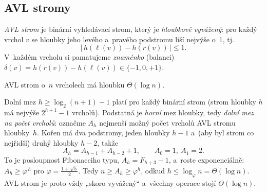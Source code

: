\documentclass[11pt,a4paper]{article}
\begin{document}
\begin{center}
\end{center}

\subsection{AVL stromy}

\begin{definice}
\emph{AVL strom} je binární vyhledávací strom, který je \emph{hloubkově vyvážený}: pro každý vrchol $v$ se hloubky jeho levého a~pravého podstromu liší nejvýše o~1, tj.
\[
\bigl|\,h(\ell(v))-h(r(v))\,\bigr|\le 1 .
\]
V~každém vrcholu si pamatujeme \emph{znaménko} (balanci) $\delta(v)=h(r(v))-h(\ell(v))\in\{-1,0,+1\}$.
\end{definice}

\begin{veta}
AVL strom o~$n$ vrcholech má hloubku $\Theta(\log n)$.
\end{veta}

\begin{intuice}
Dolní mez $h\ge\log_2(n+1)-1$ platí pro každý binární strom (strom hloubky $h$ má nejvýše $2^{h+1}-1$ vrcholů). Podstatná je \emph{horní} mez hloubky, tedy \emph{dolní mez na počet vrcholů}: označme $A_h$ nejmenší možný počet vrcholů AVL stromu hloubky~$h$. Kořen má dva podstromy, jeden hloubky $h-1$ a~(aby byl strom co nejřidší) druhý hloubky $h-2$, takže
\[
A_h=A_{h-1}+A_{h-2}+1,\qquad A_0=1,\ A_1=2.
\]
To je posloupnost Fibonacciho typu, $A_h=F_{h+3}-1$, a~roste exponenciálně: $A_h\ge \varphi^{\,h}$ pro $\varphi=\tfrac{1+\sqrt5}{2}$. Tedy $n\ge A_h\ge\varphi^h$, odkud $h\le\log_\varphi n=\Theta(\log n)$. AVL strom je proto vždy „skoro vyvážený`` a~všechny operace stojí $\Theta(\log n)$.
\end{intuice}
\end{document}
